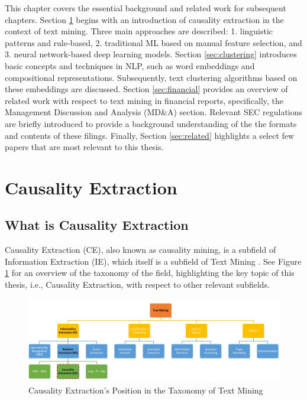 
This chapter covers the essential background and related work for subsequent chapters. Section \ref{sec:CE} begins with an introduction of causality extraction in the context of text mining. Three main approaches are described: 1. linguistic patterns and rule-based, 2. traditional ML based on manual feature selection, and 3. neural network-based deep learning models. Section \ref{sec:clustering} introduces basic concepts and techniques in NLP, such as word embeddings and compositional representations. Subsequently, text clustering algorithms based on these embeddings are discussed. Section \ref{sec:financial} provides an overview of related work with respect to text mining in financial reports, specifically, the Management Discussion and Analysis (MD\&A) section. Relevant SEC regulations are briefly introduced to provide a background understanding of the the formats and contents of these filings. Finally, Section \ref{sec:related} highlights a select few papers that are most relevant to this thesis.



\section{Causality Extraction} \label{sec:CE}

\subsection{What is Causality Extraction}

Causality Extraction (CE), also known as causality mining, is a subfield of Information Extraction (IE), which itself is a subfield of Text Mining \cite{Yang21Survey,Ali21Survey}. See Figure \ref{fig:CETaxomony} for an overview of the taxonomy of the field, highlighting the key topic of this thesis, i.e., Causality Extraction, with respect to other relevant subfields. 

\begin{figure}[h!]
\centering
  \includegraphics[scale=0.7]{figures/CETaxonomy.png}
  \caption{Causality Extraction's Position in the Taxonomy of Text Mining}
  \label{fig:CETaxomony}
\end{figure}


